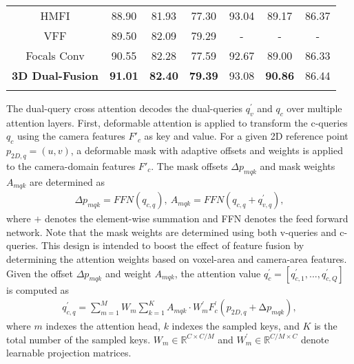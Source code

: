 \documentclass[lettersize,journal]{IEEEtran}
\begin{document}
\begin{table*}[t]
\begin{tabular}{ccccccc}
HMFI\cite{hmfi} & 88.90 & 81.93 & 77.30 & 93.04 & 89.17 & 86.37 \\
VFF\cite{vff}           & 89.50    & 82.09                & 79.29    &   -       &   -                  &   -      \\
Focals Conv\cite{focalsconv}       & 90.55    & 82.28                & 77.59    & 92.67     & 89.00                & 86.33    \\
\cline{1-7}
\textbf{3D Dual-Fusion} & \textbf{91.01}    & \textbf{82.40}       & \textbf{79.39}& 93.08& \textbf{90.86}       & 86.44\\
\cline{1-7}
\label{table:kitti_test}
\end{tabular}
\end{table*} 
 
The dual-query cross attention decodes the dual-queries $q^{\prime}_{v}$ and $q_{c}$ over multiple attention layers.
First, deformable attention is applied to transform the c-queries $q_{c}$ using the camera features $F'_{c}$  as key and value. For a given 2D reference point $p_{2D,q}=(u,v)$, a deformable mask with adaptive offsets and weights is applied to the camera-domain features $F'_c$. The mask offsets $ \Delta p_{mqk}$ and  mask weights $A_{mqk}$ are determined as
\begin{align}
 \Delta p_{mqk}=FFN\left(q_{c,q}\right),\ A_{mqk}=FFN\left(q_{c,q}+q^\prime_{v,q}\right),
\end{align}
where  $+$ denotes the element-wise summation and FFN denotes the feed forward network. Note that the mask weights are determined using both v-queries and c-queries. This design is intended to boost the effect of feature fusion by determining the attention weights based on voxel-area and camera-area features.  Given the offset $\Delta{p}_{mqk}$ and weight ${A}_{mqk}$, the attention value $q^\prime_c = [q^\prime_{c,1},...,q^\prime_{c,Q}]$ is computed as 
\begin{align}
    q^\prime_{c,q}=   \sum_{m=1}^{M}{W_m\sum_{k=1}^{K}{A_{mqk}\cdot W_m^\prime F^\prime_c\left(p_{2D,q}+\mathrm{\Delta}p_{mqk}\right)}},
\end{align}
where $m$ indexes the attention head, $k$ indexes the sampled keys, and $K$ is the total number of the sampled keys. $W_{m}\in\mathbb{R}^{C{\times}C/M}$ and $W^{\prime}_m\in\mathbb{R}^{C/M{\times}C}$ denote learnable projection matrices.
\end{document}
